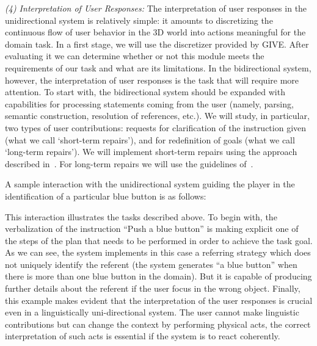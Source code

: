 \emph{(4) Interpretation of User Responses:} The interpretation of user
responses in the unidirectional system is relatively simple: it amounts to
discretizing the continuous flow of user behavior in the 3D world into actions
meaningful for the domain task. In a first
stage, we will use the discretizer provided by GIVE. After evaluating it we can
determine whether or not this module meets the requirements of
our task and what are its limitations. In the bidirectional system, however,
the interpretation of user responses is the task that will require more
attention.
To start with, the bidirectional system should be expanded with capabilities
for  processing statements coming from the user (namely, parsing, semantic
construction, resolution of references, etc.). We will study, in particular, two
types of user contributions: requests for clarification of the instruction
given (what we call `short-term repairs'), and for redefinition of goals (what we
call `long-term repairs'). We will implement short-term repairs
using the approach described in~\cite{purver06}. For long-term repairs we will use the
guidelines of~\cite{blaylock05a}. 

\medskip
A sample interaction with the unidirectional system guiding the player in
the identification of a particular blue button is as follows:

This interaction illustrates the tasks described above. To begin with, the
verbalization of the instruction ``Push a blue button'' is making explicit one
of the steps of the plan that needs to be performed in order to achieve the
task goal. As we can see, the system implements in this case 
a referring strategy which does not uniquely identify the referent
(the system generates ``a blue button'' when there is more than one blue button 
in the domain). But it is capable of producing further details about the referent 
if the user focus in the wrong object. Finally, this example makes evident that the interpretation of
the user responses is crucial even in a linguistically uni-directional system.
The user cannot make linguistic contributions but can change the context by
performing physical acts, the correct interpretation of such acts is essential
if the system is to react coherently. 
 
